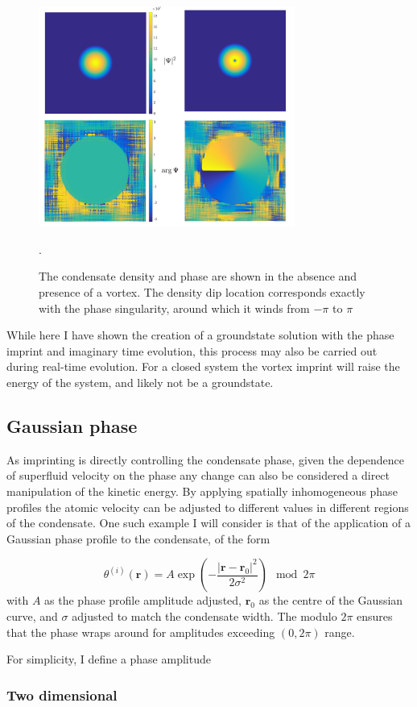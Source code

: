 \begin{figure}\centering
    \includegraphics[width=0.75\textwidth]{Images/ch4_vtx/1vtxbec.pdf}
    \caption{The condensate density and phase are shown in the absence and presence of a vortex. The density dip location corresponds exactly with the phase singularity, around which it winds from $-\pi$ to $\pi$}.\label{fig:0to1vtx}
\end{figure}
While here I have shown the creation of a groundstate solution with the phase imprint and imaginary time evolution, this process may also be carried out during real-time evolution. For a closed system the vortex imprint will raise the energy of the system, and likely not be a groundstate.

\subsection{Gaussian phase}
As imprinting is directly controlling the condensate phase, given the dependence of superfluid velocity on the phase any change can also be considered a direct manipulation of the kinetic energy. By applying spatially inhomogeneous phase profiles the atomic velocity can be adjusted to different values in different regions of the condensate. One such example I will consider is that of the application of a Gaussian phase profile to the condensate, of the form

\begin{equation}
    \theta^{(i)}(\mathbf{r}) = A\exp\left( -\frac{ |\mathbf{r}-\mathbf{r}_0|^2 }{2\sigma^2 } \right) \mod 2\pi
\end{equation}
with $A$ as the phase profile amplitude adjusted, $\mathbf{r}_0$ as the centre of the Gaussian curve, and $\sigma$ adjusted to match the condensate width. The modulo $2\pi$ ensures that the phase wraps around for amplitudes exceeding $(0,2\pi)$ range.




For simplicity, I define a phase amplitude

\subsubsection{Two dimensional}
